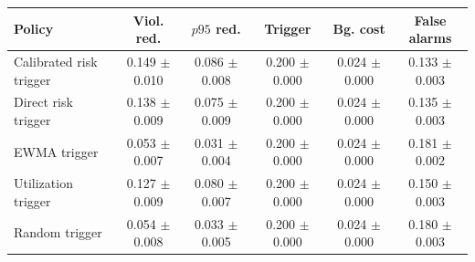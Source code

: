 \begin{tabular}{lccccc}
\hline
Policy & Viol. red. & $p95$ red. & Trigger & Bg. cost & False alarms \\
\hline
Calibrated risk trigger & 0.149 $\pm$ 0.010 & 0.086 $\pm$ 0.008 & 0.200 $\pm$ 0.000 & 0.024 $\pm$ 0.000 & 0.133 $\pm$ 0.003 \\
Direct risk trigger & 0.138 $\pm$ 0.009 & 0.075 $\pm$ 0.009 & 0.200 $\pm$ 0.000 & 0.024 $\pm$ 0.000 & 0.135 $\pm$ 0.003 \\
EWMA trigger & 0.053 $\pm$ 0.007 & 0.031 $\pm$ 0.004 & 0.200 $\pm$ 0.000 & 0.024 $\pm$ 0.000 & 0.181 $\pm$ 0.002 \\
Utilization trigger & 0.127 $\pm$ 0.009 & 0.080 $\pm$ 0.007 & 0.200 $\pm$ 0.000 & 0.024 $\pm$ 0.000 & 0.150 $\pm$ 0.003 \\
Random trigger & 0.054 $\pm$ 0.008 & 0.033 $\pm$ 0.005 & 0.200 $\pm$ 0.000 & 0.024 $\pm$ 0.000 & 0.180 $\pm$ 0.003 \\
\hline
\end{tabular}
